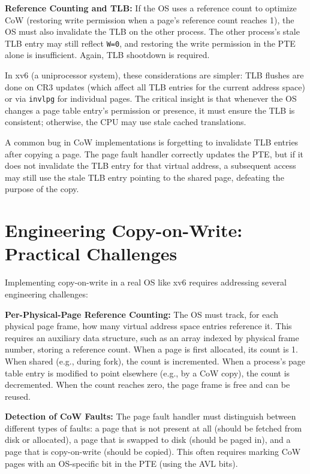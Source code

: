 \documentclass[11pt]{article}
\begin{document}
\textbf{Reference Counting and TLB:} If the OS uses a reference count to optimize CoW (restoring write permission when a page's reference count reaches 1), the OS must also invalidate the TLB on the other process. The other process's stale TLB entry may still reflect \texttt{W=0}, and restoring the write permission in the PTE alone is insufficient. Again, TLB shootdown is required.

In xv6 (a uniprocessor system), these considerations are simpler: TLB flushes are done on CR3 updates (which affect all TLB entries for the current address space) or via \texttt{invlpg} for individual pages. The critical insight is that whenever the OS changes a page table entry's permission or presence, it must ensure the TLB is consistent; otherwise, the CPU may use stale cached translations.

\begin{keytip}
A common bug in CoW implementations is forgetting to invalidate TLB entries after copying a page. The page fault handler correctly updates the PTE, but if it does not invalidate the TLB entry for that virtual address, a subsequent access may still use the stale TLB entry pointing to the shared page, defeating the purpose of the copy.
\end{keytip}

\section{Engineering Copy-on-Write: Practical Challenges}

Implementing copy-on-write in a real OS like xv6 requires addressing several engineering challenges:

\textbf{Per-Physical-Page Reference Counting:} The OS must track, for each physical page frame, how many virtual address space entries reference it. This requires an auxiliary data structure, such as an array indexed by physical frame number, storing a reference count. When a page is first allocated, its count is 1. When shared (e.g., during fork), the count is incremented. When a process's page table entry is modified to point elsewhere (e.g., by a CoW copy), the count is decremented. When the count reaches zero, the page frame is free and can be reused.

\textbf{Detection of CoW Faults:} The page fault handler must distinguish between different types of faults: a page that is not present at all (should be fetched from disk or allocated), a page that is swapped to disk (should be paged in), and a page that is copy-on-write (should be copied). This often requires marking CoW pages with an OS-specific bit in the PTE (using the AVL bits).
\end{document}
